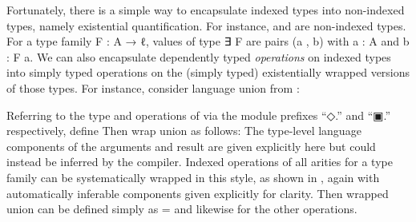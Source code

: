\documentclass[acmsmall,screen,anonymous,timestamp]{acmart}
\begin{document}
Fortunately, there is a simple way to encapsulate indexed types into non-indexed types, namely existential quantification.
For instance, { } and { } are non-indexed types.
For a type family {\AB F \AK : \AB A \AK →  \AB ℓ}, values of type {\AF ∃ \AB F} are pairs {(\AB a , \AB b)} with {\AB a \AK : \AB A} and {\AB b \AK : \AB F \AB a}.
We can also encapsulate dependently typed \emph{operations} on indexed types into simply typed operations on the (simply typed) existentially wrapped versions of those types.
For instance, consider language union from :
\begin{code}
\>[2]%
\>[7]\AgdaSymbol{:}\AgdaSpace{}%
%
\>[15]%
\>[18]\AgdaSpace{}%
\AgdaSpace{}%
%
\>[28]\AgdaSpace{}%
\AgdaSpace{}%
\AgdaSymbol{(}%
\>[39]%
\>[44]\AgdaSymbol{)}\<%
\end{code}
Referring to the type and operations of  via the module prefixes ``{◇.}\hspace{0.05em}'' and ``{▣.}\hspace{0.05em}'' respectively, define 
Then wrap union as follows:
The type-level language components of the arguments and result are given explicitly here but could instead be inferred by the compiler.
\rnc{}
Indexed operations of all arities for a type family  can be systematically wrapped in this style, as shown in
, again with automatically inferable components given explicitly for clarity.
Then wrapped union can be defined simply as { \AS =  } and likewise for the other operations.
\end{document}
